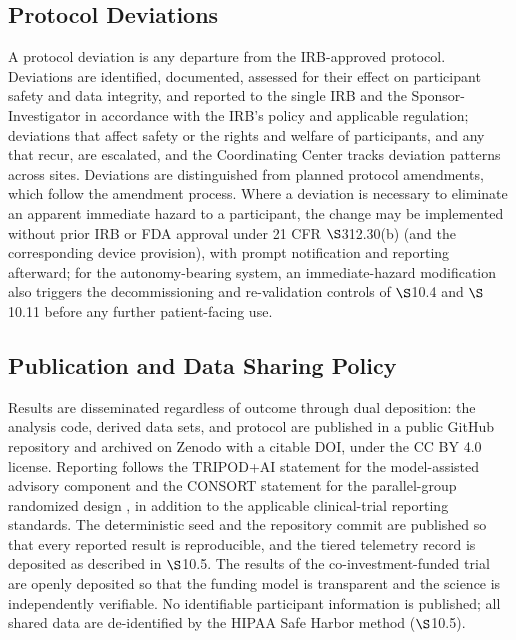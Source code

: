 \subsection{\hspace{0.03cm} Protocol Deviations}

A protocol deviation is any departure from the IRB-approved protocol. Deviations are
identified, documented, assessed for their effect on participant safety and data
integrity, and reported to the single IRB and the Sponsor-Investigator in accordance
with the IRB's policy and applicable regulation; deviations that affect safety or
the rights and welfare of participants, and any that recur, are escalated, and the
Coordinating Center tracks deviation patterns across sites. Deviations are
distinguished from planned protocol amendments, which follow the amendment process.
Where a deviation is necessary to eliminate an apparent immediate hazard to a
participant, the change may be implemented without prior IRB or FDA approval under 21
CFR $\S$312.30(b) (and the corresponding device provision), with prompt notification
and reporting afterward; for the autonomy-bearing system, an immediate-hazard
modification also triggers the decommissioning and re-validation controls of
$\S$10.4 and $\S$10.11 before any further patient-facing use.

\subsection{\hspace{0.03cm} Publication and Data Sharing Policy}

Results are disseminated regardless of outcome through dual deposition: the analysis
code, derived data sets, and protocol are published in a public GitHub repository
and archived on Zenodo with a citable DOI, under the CC BY 4.0 license. Reporting
follows the TRIPOD+AI statement for the model-assisted advisory component
\cite{Collins2024tripodai} and the CONSORT statement for the parallel-group
randomized design \cite{Schulz2010consort}, in addition to the applicable
clinical-trial reporting standards. The deterministic seed and the repository commit
are published so that every reported result is reproducible, and the tiered
telemetry record is deposited as described in $\S$10.5. The results of the
co-investment-funded trial are openly deposited so that the funding model is
transparent and the science is independently verifiable. No identifiable participant
information is published; all shared data are de-identified by the HIPAA Safe Harbor
method ($\S$10.5).

